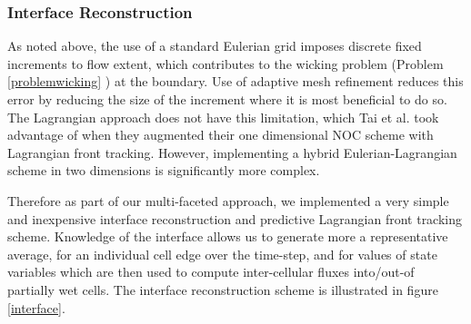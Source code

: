 \documentclass[letterpaper,10pt]{article}
\begin{document}




\subsubsection{Interface Reconstruction} \label{Interfacerecon}
As noted above, the use of a standard Eulerian grid imposes discrete 
fixed increments to flow extent, which contributes to the wicking problem
(Problem \ref{problemwicking} ) at the 
boundary.  Use of adaptive mesh refinement 
reduces this error by reducing the size of the increment where it is
most beneficial to do so.  The Lagrangian approach does not have this 
limitation, which Tai et al. \cite{Tai2002} took advantage
of when they augmented their one dimensional NOC scheme with 
Lagrangian front tracking.  However, implementing a hybrid 
Eulerian-Lagrangian scheme in two dimensions is significantly more 
complex. 

Therefore as part of our multi-faceted approach, we implemented a very 
simple and inexpensive interface reconstruction and predictive 
Lagrangian front tracking scheme.  Knowledge of the interface allows
us to generate more a representative average, for an individual cell edge 
over the time-step, and for values of state variables which are then used to 
compute inter-cellular fluxes into/out-of partially wet cells.  The 
interface reconstruction scheme is illustrated in figure \ref{interface}.\newline
\end{document}
